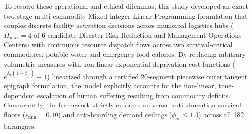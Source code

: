 To resolve these operational and ethical dilemmas, this study developed an exact two-stage multi-commodity Mixed-Integer Linear Programming formulation that couples discrete facility activation decisions across municipal logistics hubs ($H_{\max} = 4$ of 6 candidate Disaster Risk Reduction and Management Operations Centers) with continuous resource dispatch flows across two survival-critical commodities: potable water and emergency food calories. By replacing arbitrary volumetric measures with non-linear exponential deprivation cost functions ($e^{\lambda_r(1-\phi_{jr})} - 1$) linearized through a certified 20-segment piecewise outer tangent epigraph formulation, the model explicitly accounts for the non-linear, time-dependent escalation of human suffering resulting from commodity deficits. Concurrently, the framework strictly enforces universal anti-starvation survival floors ($\varepsilon_{\min} = 0.10$) and anti-hoarding demand ceilings ($\phi_{jr} \le 1.0$) across all 182 barangays.

